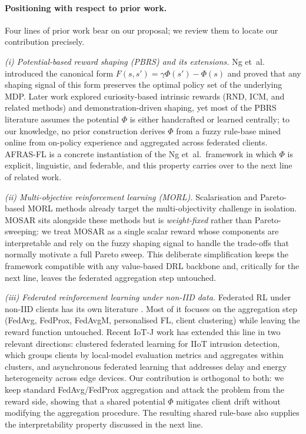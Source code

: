 \documentclass[ai,article,submit,moreauthors,pdftex]{Definitions/mdpi}
\begin{document}
\paragraph{Positioning with respect to prior work.}
Four lines of prior work bear on our proposal; we review them to
locate our contribution precisely.

\emph{(i) Potential-based reward shaping (PBRS) and its
extensions.} Ng et~al.\cite{ng1999policy_invariance} introduced the
canonical form $F(s,s') = \gamma \Phi(s') - \Phi(s)$ and proved that
any shaping signal of this form preserves the optimal policy set of
the underlying MDP. Later work explored curiosity-based intrinsic
rewards (RND, ICM, and related methods) and demonstration-driven
shaping, yet most of the PBRS literature assumes the potential
$\Phi$ is either handcrafted or learned centrally; to our knowledge,
no prior construction derives $\Phi$ from a fuzzy rule-base mined
online from on-policy experience and aggregated across federated
clients. AFRAS-FL is a concrete instantiation of the Ng et~al.\
framework in which $\Phi$ is explicit, linguistic, and federable,
and this property carries over to the next line of related work.

\emph{(ii) Multi-objective reinforcement learning (MORL).}
Scalarisation and Pareto-based MORL methods\cite{li2022review}
already target the multi-objectivity challenge in isolation. MOSAR
sits alongside these methods but is \emph{weight-fixed} rather than
Pareto-sweeping: we treat MOSAR as a single scalar reward whose
components are interpretable and rely on the fuzzy shaping signal
to handle the trade-offs that normally motivate a full Pareto sweep.
This deliberate simplification keeps the framework compatible with
any value-based DRL backbone and, critically for the next line,
leaves the federated aggregation step untouched.

\emph{(iii) Federated reinforcement learning under non-IID data.}
Federated RL under non-IID clients has its own literature
\cite{mcmahan2017fedavg,li2020fedprox,hsu2019fedavgm,
kairouz2021advances,li2024federated_noniid,friha2024fl_iot_survey,
yuan2024decentralized}. Most of it focuses on the aggregation step
(FedAvg, FedProx, FedAvgM, personalised FL, client clustering)
while leaving the reward function untouched. Recent IoT-J work has
extended this line in two relevant directions: clustered federated
learning for IIoT intrusion detection, which groups clients by
local-model evaluation metrics and aggregates within
clusters\cite{shan2024cflids}, and asynchronous federated learning
that addresses delay and energy heterogeneity across edge
devices\cite{liu2024delay}. Our contribution is orthogonal to both:
we keep standard FedAvg/FedProx aggregation and attack the problem
from the reward side, showing that a shared potential $\Phi$
mitigates client drift without modifying the aggregation procedure.
The resulting shared rule-base also supplies the interpretability
property discussed in the next line.
\end{document}
